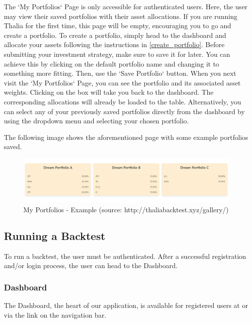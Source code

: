 \documentclass[main.tex]{subfiles}
\begin{document}
The `My Portfolios` Page is only accessible for authenticated users. Here, the user may view their saved portfolios with their asset allocations. If you are running Thalia for the first time, this page will be empty, encouraging you to go and create a portfolio.
To create a portfolio, simply head to the dashboard and allocate your assets following the instructions in \ref{create_portfolio}. Before submitting your investment strategy, make sure to save it for later. You can achieve this by clicking on the default portfolio name and changing it to something more fitting. Then, use the `Save Portfolio` button. When you next visit the `My Portfolios` Page, you can see the portfolio and its associated asset weights. Clicking on the box will take you back to the dashboard. The corresponding allocations will already be loaded to the table. Alternatively, you can select any of your previously saved portfolios directly from the dashboard by using the dropdown menu and selecting your chosen portfolio.

The following image shows the aforementioned page with some example portfolios saved.
\begin{figure}[H]
   \centering
   \includegraphics[width=\textwidth]{08Appendices/081User/081Pictures/my_portfolios.png}
   \caption{My Portfolios - Example (source: http://thaliabacktest.xyz/gallery/)}
\end{figure}

\subsection{Running a Backtest}

To run a backtest, the user must be authenticated. After a successful registration and/or login process, the user can head to the Dashboard.

\subsubsection{Dashboard}

The Dashboard, the heart of our application, is available for registered users at  or via the link on the navigation bar.
\end{document}
